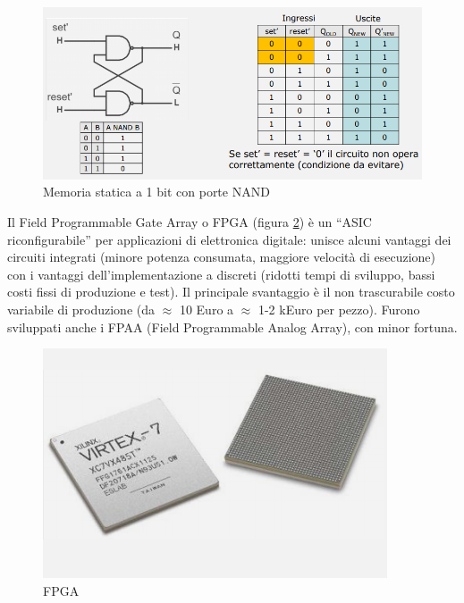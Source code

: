 \documentclass{article}
\begin{document}
\begin{figure}[h]
  \centering
  \includegraphics[scale=0.5]{IM_flip_flop_NAND}
  \caption{Memoria statica a 1 bit con porte NAND}
  \label{flip_flop_NAND}
\end{figure}

Il Field Programmable Gate Array o FPGA (figura \ref{FPGA}) è un “ASIC riconfigurabile” per applicazioni di elettronica digitale: unisce alcuni vantaggi dei circuiti integrati (minore potenza consumata, maggiore velocità di esecuzione) con i vantaggi dell’implementazione a discreti (ridotti tempi di sviluppo, bassi costi fissi di produzione e test). Il principale svantaggio è il non trascurabile costo variabile di produzione (da $\approx$ 10 Euro a $\approx$ 1-2 kEuro per pezzo). Furono sviluppati anche i FPAA (Field Programmable Analog Array), con minor fortuna.

\begin{figure}[h]
  \centering
  \includegraphics[scale=0.4]{IM_FPGA}
  \caption{FPGA}
  \label{FPGA}
\end{figure}
\end{document}
